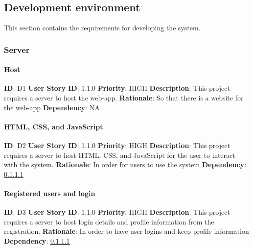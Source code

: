 \documentclass{article}
\begin{document}
\subsection{Development environment}
This section contains the requirements for developing the system.

\subsubsection{Server}

\paragraph{Host}\label{req:server}
\textbf{ID}: D1\newline
\textbf{User Story ID}: 1.1.0\newline
\textbf{Priority}: HIGH\newline
\textbf{Description}: This project requires a server to host the web-app.\newline
\textbf{Rationale}: So that there is a website for the web-app\newline
\textbf{Dependency}: NA

\paragraph{HTML, CSS, and JavaScript}\label{req:hostingLogin}
\textbf{ID}: D2\newline
\textbf{User Story ID}: 1.1.0\newline
\textbf{Priority}: HIGH\newline
\textbf{Description}: This project requires a server to host HTML, CSS, and JavaScript for the user to interact with the system.\newline
\textbf{Rationale}: In order for users to use the system\newline
\textbf{Dependency}: \ref{req:server}

\paragraph{Registered users and login}\label{req:hostingLogin}
\textbf{ID}: D3\newline
\textbf{User Story ID}: 1.1.0\newline
\textbf{Priority}: HIGH\newline
\textbf{Description}: This project requires a server to host login details and profile information from the registration.\newline
\textbf{Rationale}: In order to have user logins and keep profile information\newline
\textbf{Dependency}: \ref{req:server}
\end{document}
